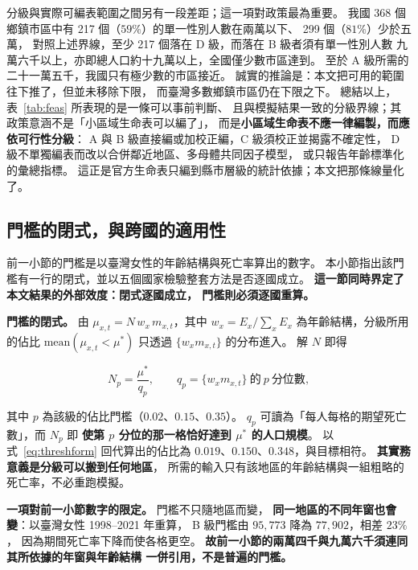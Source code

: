 \documentclass[UTF8, fontset=macnew, a4paper, 12pt]{ctexart}
\begin{document}
分級與實際可編表範圍之間另有一段差距；這一項對政策最為重要。
我國 368 個鄉鎮市區中有 217 個（$59\%$）的單一性別人數在兩萬以下、
299 個（$81\%$）少於五萬，
對照上述界線，至少 217 個落在 D 級，而落在 B 級者須有單一性別人數
九萬六千以上，亦即總人口約十九萬以上，全國僅少數市區達到。
至於 A 級所需的二十一萬五千，我國只有極少數的市區接近。
誠實的推論是：本文把可用的範圍往下推了，但並未移除下限，
而臺灣多數鄉鎮市區仍在下限之下。
總結以上，表~\ref{tab:feas} 所表現的是一條可以事前判斷、
且與模擬結果一致的分級界線；其政策意涵不是「小區域生命表可以編了」，
而是\textbf{小區域生命表不應一律編製，而應依可行性分級}：
A 與 B 級直接編或加校正編，C 級須校正並揭露不確定性，
D 級不單獨編表而改以合併鄰近地區、多母體共同因子模型，
或只報告年齡標準化的彙總指標。
這正是官方生命表只編到縣市層級的統計依據；本文把那條線量化了。

\subsection{門檻的閉式，與跨國的適用性}\label{subsec:thresholdform}

前一小節的門檻是以臺灣女性的年齡結構與死亡率算出的數字。
本小節指出該門檻有一行的閉式，並以五個國家檢驗整套方法是否逐國成立。
\textbf{這一節同時界定了本文結果的外部效度：閉式逐國成立，
門檻則必須逐國重算。}

\textbf{門檻的閉式。} 由 $\mu_{x,t}=N\,w_x\,m_{x,t}$，其中
$w_x=E_x/\sum_x E_x$ 為年齡結構，分級所用的佔比
$\mathrm{mean}(\mu_{x,t}<\mu^{\ast})$ 只透過 $\{w_x m_{x,t}\}$ 的分布進入。
解 $N$ 即得

\begin{equation}\label{eq:threshform}
N_p=\frac{\mu^{\ast}}{q_p},\qquad
q_p=\{w_x m_{x,t}\}\ \text{的}\ p\ \text{分位數},
\end{equation}

其中 $p$ 為該級的佔比門檻（$0.02$、$0.15$、$0.35$）。
$q_p$ 可讀為「每人每格的期望死亡數」，而 $N_p$ 即
\textbf{使第 $p$ 分位的那一格恰好達到 $\mu^{\ast}$ 的人口規模}。
以式~\eqref{eq:threshform} 回代算出的佔比為
$0.019$、$0.150$、$0.348$，與目標相符。
\textbf{其實務意義是分級可以搬到任何地區}，
所需的輸入只有該地區的年齡結構與一組粗略的死亡率，不必重跑模擬。

\textbf{一項對前一小節數字的限定。} 門檻不只隨地區而變，
\textbf{同一地區的不同年窗也會變}：以臺灣女性 1998--2021 年重算，
B 級門檻由 $95{,}773$ 降為 $77{,}902$，相差 $23\%$，
因為期間死亡率下降而使各格更空。
\textbf{故前一小節的兩萬四千與九萬六千須連同其所依據的年窗與年齡結構
一併引用，不是普遍的門檻。}
\end{document}
